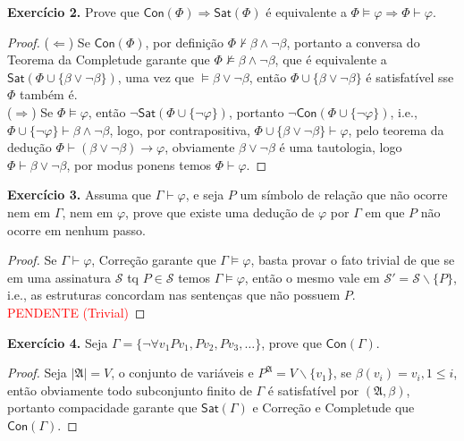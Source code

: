 \documentclass[11pt]{article}
\newcommand{\mc}[1]{\mathcal{#1}}
\newcommand{\mf}[1]{\mathfrak{#1}}
\newcommand{\msf}[1]{\mathsf{#1}}
\begin{document}
\begin{shaded}
\textbf{Exercício 2.} Prove que $\msf{Con}(\Phi)\Rightarrow\msf{Sat}(\Phi)$ é equivalente a $\Phi\vDash\varphi\Rightarrow\Phi\vdash\varphi$.
\end{shaded}

\begin{proof}
    ($\Leftarrow$) Se $\msf{Con}(\Phi)$, por definição $\Phi\nvdash\beta\wedge\neg\beta$, portanto a conversa do Teorema da Completude garante que $\Phi\nvDash\beta\wedge\neg\beta$, que é equivalente a $\msf{Sat}(\Phi\cup\{\beta\vee\neg\beta\})$, uma vez que $\vDash\beta\vee\neg\beta$, então $\Phi\cup\{\beta\vee\neg\beta\}$ é satisfatível sse $\Phi$ também é.\\
    ($\Rightarrow$) Se $\Phi\vDash\varphi$, então $\neg\msf{Sat}(\Phi\cup\{\neg\varphi\})$, portanto $\neg\msf{Con}(\Phi\cup\{\neg\varphi\})$, i.e., $\Phi\cup\{\neg\varphi\}\vdash\beta\wedge\neg\beta$, logo, por contrapositiva, $\Phi\cup\{\beta\vee\neg\beta\}\vdash\varphi$, pelo teorema da dedução $\Phi\vdash(\beta\vee\neg\beta)\to\varphi$, obviamente $\beta\vee\neg\beta$ é uma tautologia, logo $\Phi\vdash\beta\vee\neg\beta$, por modus ponens temos $\Phi\vdash\varphi$.
\end{proof}

\begin{shaded}
\textbf{Exercício 3.} Assuma que $\Gamma\vdash\varphi$, e seja $P$ um símbolo de relação que não ocorre nem em $\Gamma$, nem em $\varphi$, prove que existe uma dedução de $\varphi$ por $\Gamma$ em que $P$ não ocorre em nenhum passo.
\end{shaded}

\begin{proof}
    Se $\Gamma\vdash\varphi$, Correção garante que $\Gamma\vDash\varphi$, basta provar o fato trivial de que se em uma assinatura $\mc{S}$ tq $P\in\mc{S}$ temos $\Gamma\vDash\varphi$, então o mesmo vale em $\mc{S}'=\mc{S}\backslash\{P\}$, i.e., as estruturas concordam nas sentenças que não possuem $P$.\\
    \textcolor{red}{PENDENTE (Trivial)}
\end{proof}

\begin{shaded}
\textbf{Exercício 4.} Seja $\Gamma=\{\neg\forall v_1Pv_1,Pv_2,Pv_3,\dots\}$, prove que $\msf{Con}(\Gamma)$.
\end{shaded}

\begin{proof}
    Seja $|\mf{A}|=V$, o conjunto de variáveis e $P^\mf{A}=V\backslash\{v_1\}$, se $\beta(v_i)=v_i,1\leq i$, então obviamente todo subconjunto finito de $\Gamma$ é satisfatível por $(\mf{A},\beta)$, portanto compacidade garante que $\msf{Sat}(\Gamma)$ e Correção e Completude que $\msf{Con}(\Gamma)$.
\end{proof}
\end{document}
